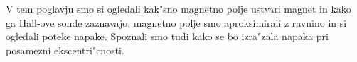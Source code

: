 V tem poglavju smo si ogledali kak"sno magnetno polje ustvari magnet in kako ga Hall-ove sonde zaznavajo. magnetno polje smo aproksimirali z ravnino in si ogledali poteke napake.  Spoznali smo tudi kako se bo izra"zala napaka pri posamezni ekscentri"cnosti.




















